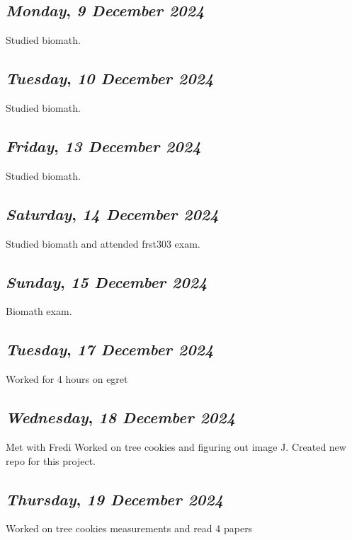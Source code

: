 \def\day{\textit{9 December 2024}}
\def\weekday{\textit{Monday}}
\subsection*{\weekday, \day}
Studied biomath.

\def\day{\textit{10 December 2024}}
\def\weekday{\textit{Tuesday}}
\subsection*{\weekday, \day}
Studied biomath.

\def\day{\textit{13 December 2024}}
\def\weekday{\textit{Friday}}
\subsection*{\weekday, \day}
Studied biomath.
\def\day{\textit{14 December 2024}}
\def\weekday{\textit{Saturday}}
\subsection*{\weekday, \day}
Studied biomath and attended frst303 exam.

\def\day{\textit{15 December 2024}}
\def\weekday{\textit{Sunday}}
\subsection*{\weekday, \day}
Biomath exam.

\def\day{\textit{17 December 2024}}
\def\weekday{\textit{Tuesday}}
\subsection*{\weekday, \day}
Worked for 4 hours on egret 

\def\day{\textit{18 December 2024}}
\def\weekday{\textit{Wednesday}}
\subsection*{\weekday, \day}
Met with Fredi Worked on tree cookies and figuring out image J. Created new repo for this project.

\def\day{\textit{19 December 2024}}
\def\weekday{\textit{Thursday}}
\subsection*{\weekday, \day}
Worked on tree cookies measurements and read 4 papers

